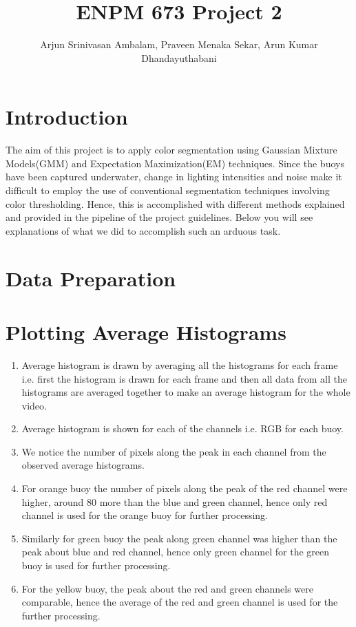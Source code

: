 \documentclass{article}
\title{ENPM 673 Project 2}
\author{Arjun Srinivasan Ambalam, Praveen Menaka Sekar, Arun Kumar Dhandayuthabani}
\begin{document}
\maketitle

\section{Introduction}
The aim of this project is to apply color segmentation using Gaussian Mixture Models(GMM) and
Expectation Maximization(EM) techniques. Since the buoys have been captured
underwater, change in lighting intensities and noise make it difficult to employ the use of
conventional segmentation techniques involving color thresholding. Hence, this is
accomplished with different methods explained and provided in the pipeline of the project
guidelines. Below you will see explanations of what we did to accomplish such an arduous
task.


\section{Data Preparation}


\section{Plotting Average Histograms}
\begin{enumerate}
    \item Average histogram is drawn by averaging all the histograms for each frame i.e. first the histogram
is drawn for each frame and then all data from all the histograms are averaged together to make an
average histogram for the whole video.
    \item Average histogram is shown for each of the channels i.e. RGB for each buoy.
    \item We notice the number of pixels along the peak in each channel from the observed average histograms.
    \item For orange buoy the number of pixels along the peak of the red channel were higher, around 80
more than the blue and green channel, hence only red channel is used for the orange buoy for further
processing.
    \item Similarly for green buoy the peak along green channel was higher than the peak about blue and red
channel, hence only green channel for the green buoy is used for further processing.
    \item For the yellow buoy, the peak about the red and green channels were comparable, hence the average of
the red and green channel is used for the further processing.
\end{enumerate}
\end{document}
